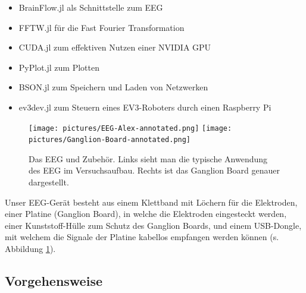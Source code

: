 \documentclass[10pt]{scrartcl}
\begin{document}
\begin{itemize}
\begin{itemize}
			\item BrainFlow.jl als Schnittstelle zum EEG
				\cite{brainflow}
			
			\item FFTW.jl für die Fast Fourier Transformation
				\cite{FFTW.jl-2005}
			
			\item CUDA.jl zum effektiven Nutzen einer NVIDIA GPU
				\cite{CUDA}
			
			\item PyPlot.jl zum Plotten
				\cite{pyplot}
			
			\item BSON.jl zum Speichern und Laden von Netzwerken
			
			\item ev3dev.jl zum Steuern eines EV3-Roboters durch einen Raspberry Pi
				\cite{ev3dev}
			
		\end{itemize}

	\end{itemize}

	\begin{figure}[h!]
		\texttt{[image: pictures/EEG-Alex-annotated.png]}
		\texttt{[image: pictures/Ganglion-Board-annotated.png]}
		\caption{Das EEG und Zubehör. Links sieht man die typische Anwendung des EEG im Versuchsaufbau. Rechts ist das Ganglion Board genauer dargestellt.}
		\label{EEG-Zubehor}
	\end{figure}

	Unser EEG-Gerät besteht aus einem Klettband mit Löchern für die Elektroden, einer Platine (Ganglion Board), in welche die Elektroden eingesteckt werden, einer Kunststoff-Hülle zum Schutz des Ganglion Boards, und einem USB-Dongle, mit welchem die Signale der Platine kabellos empfangen werden können (s. Abbildung \ref{EEG-Zubehor}).

	\subsection{Vorgehensweise}
\end{document}

